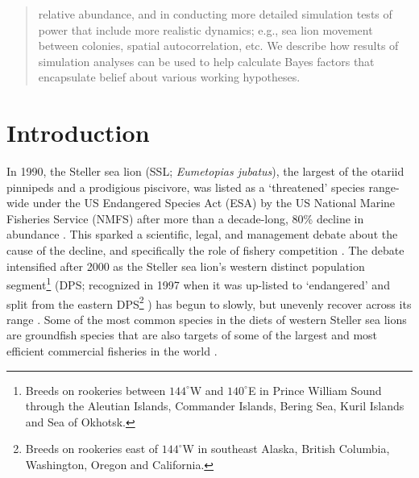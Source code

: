 \documentclass[nonumbib,leqno]{nrc1}
\begin{document}
\begin{abstract}
relative abundance, and in conducting more detailed simulation tests of power that include more realistic dynamics; e.g., sea lion movement between colonies, spatial autocorrelation, etc.  We describe how results of simulation analyses can be used to help calculate Bayes factors that encapsulate belief about various working hypotheses.
\end{abstract}




\clearpage

\renewcommand{\baselinestretch}{1.8}\normalsize


\section{Introduction}

In 1990, the Steller sea lion (SSL; {\it Eumetopias jubatus}), the largest of the otariid pinnipeds and a prodigious piscivore, was listed as a `threatened' species range-wide under the US Endangered Species Act (ESA) by the US National Marine Fisheries Service (NMFS) after more than a decade-long, 80\% decline in abundance \citep{CalkinsPitcher1982,LoughlinEtAl1992,NMFS1992}.  This sparked a scientific, legal, and management debate about the cause of the decline, and specifically the role of fishery competition \citep{Alverson1992,NMFS1992,FritzEtAl1995,RosenTrites2000,McBeath2004}.  The debate intensified after 2000 as the Steller sea lion's western distinct population segment\footnote[1]{Breeds on rookeries between $144^\circ$W and $140^\circ$E in Prince William Sound through the Aleutian Islands, Commander Islands, Bering Sea, Kuril Islands and Sea of Okhotsk.}  (DPS; recognized in 1997 when it was up-listed to  `endangered' and split from the eastern DPS\footnote[2]{Breeds on rookeries east of $144^\circ$W in southeast Alaska, British Columbia, Washington, Oregon and California.} ) has begun to slowly, but unevenly recover across its range \citep{Loughlin1997,JohnsonFritzInReview, NMFS2013}.  Some of the most common species in the diets of western Steller sea lions are groundfish species \citep[e.g., walleye pollock {\it Theragra chalcogramma}, Pacific cod {\it Gadus macrocephalus}, and Atka mackerel {\it Pleurogrammus monopterygius};][]{ SinclairZeppelin2002,TollitEtAl2004,ZeppelinEtAl2004,McKenzieWynne2008,WaiteEtAl2012} that are also targets of some of the largest and most efficient commercial fisheries in the world \citep{FissellEtAl2013}.
\end{document}
